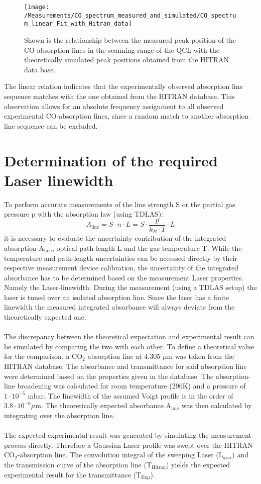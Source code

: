 \begin{figure}[H]
	\centering
	\texttt{[image: /Measurements/CO\_spectrum\_measured\_and\_simulated/CO\_spectrum\_linear\_Fit\_with\_Hitran\_data]}
	\caption{Shown is the relationship between the measured peak position of the CO absorption lines in the scanning range of the QCL with the theoretically simulated peak positions obtained from the HITRAN data base.}
	\label{fig:CO_spectrum_linear_Fit_with_Hitran_data}
\end{figure}
\noindent
The linear relation indicates that the experimentally observed absorption line sequence matches with the one obtained from the HITRAN database. This observation allows for an absolute frequency assignment to all observed experimental CO-absorption lines, since a random match to another absorption line sequence can be excluded.
\section{Determination of the required Laser linewidth}
To perform accurate measurements of the line strength S or the partial gas pressure p with the absorption law (using TDLAS):
\begin{equation}
	A_{\text{line}} = S\cdot n \cdot L = S \cdot \frac{p}{k_B\cdot T} \cdot L
\end{equation}
it is necessary to evaluate the uncertainty contribution of the integrated absorption A$_{{\text{line}}}$, optical path-length L and the gas temperature T. While the temperature and path-length uncertainties can be accessed directly by their respective measurement device calibration, the uncertainty of the integrated absorbance has to be determined based on the measurement Laser properties. Namely the Laser-linewidth. During the measurement (using a TDLAS setup) the laser is tuned over an isolated absorption line. Since the laser has a finite linewidth the measured integrated absorbance will always deviate from the theoretically expected one. \\ \\ The discrepancy between the theoretical expectation and experimental result can be simulated by comparing the two with each other. To define a theoretical value for the comparison, a CO$_2$ absorption line at 4.305 $\mu$m was taken from the HITRAN database. The absorbance and transmittance for said absorption line were determined based on the properties given in the database. The absorption-line broadening was calculated for room temperature (296K) and a pressure of $1 \cdot 10^{-5}$ mbar. The linewidth of the assumed Voigt profile is in the order of $3.8 \cdot 10^{-6} \mu$m. The theoretically expected absorbance A$_{{\text{line}}}$ was then calculated by integrating over the absorption line.\\ \\ The expected experimental result was generated by simulating the measurement process directly. Therefore a Gaussian Laser profile was swept over the HITRAN-CO$_2$-absorption line. The convolution integral of the sweeping Laser (L$_{\text{aser}}$) and the transmission curve of the absorption line (T$_{\text{Hitran}}$) yields the expected experimental result for the transmittance ($\text{T}_{\text{Exp}}$).

